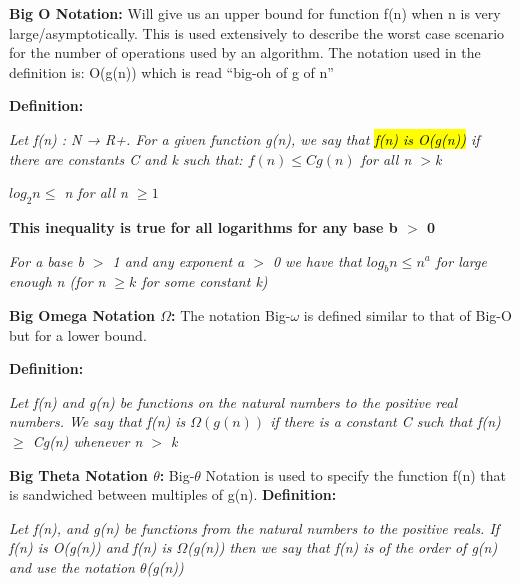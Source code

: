 \documentclass{article}
\begin{document}
\begin{flushleft}
\textbf{Big O Notation:} 
Will give us an upper bound for function f(n) when n is very large/asymptotically. 
This is used extensively to describe the worst case scenario for the number of operations used by an algorithm.
The notation used in the definition is: O(g(n)) which is read “big-oh of g of n”

\textbf{Definition:}\begin{tcolorbox}[enhanced,width=7.5in,center upper,size=fbox,drop shadow southwest,sharp corners]
\textit{Let f(n) : N → R+. For a given function g(n), we say that \hl{f(n) is O(g(n))} if there are constants C and k such that: $f(n) \leq Cg(n)$ for all n $>$k}
\end{tcolorbox}

\begin{tcolorbox}[enhanced,width=2in,center upper,size=fbox,drop shadow southwest,sharp corners]
\textit{$log_2 n \leq$ n for all n $\geq 1$}
\end{tcolorbox}

\textbf{This inequality is true for all logarithms for any base b $>$ 0}
\begin{tcolorbox}[enhanced,width=7.5in,center upper,size=fbox,drop shadow southwest,sharp corners]
\textit{For a base \textit{b} $>$ 1 and any exponent \textit{a} $>$ 0 we have that $log_b n \leq n^a$ for large enough n (for n $\geq k$ for some constant k)}
\end{tcolorbox} 

\vspace{8mm}\textbf{Big Omega Notation $\Omega$:}
The notation Big-$\omega$ is defined similar to that of Big-O but for a lower bound.

\textbf{Definition:}\begin{tcolorbox}[enhanced,width=7.5in,center upper,size=fbox,drop shadow southwest,sharp corners]
\textit{Let f(n) and g(n) be functions on the natural numbers to the positive real numbers. We say that f(n) is $\Omega(g(n))$ if there is a constant C such that f(n) $\geq$ Cg(n) whenever n $>$ k}
\end{tcolorbox}

\vspace{8mm}\textbf{Big Theta Notation $\theta$:}
Big-$\theta$ Notation is used to specify the function f(n) that is sandwiched between multiples of g(n).
\textbf{Definition:}\begin{tcolorbox}[enhanced,width=7.5in,center upper,size=fbox,drop shadow southwest,sharp corners]
\textit{Let f(n), and g(n) be functions from the natural numbers to the positive reals. If f(n) is O(g(n)) and f(n) is $\Omega$(g(n)) then we say that f(n) is of the order of g(n) and use the notation $\theta$(g(n))}
\end{tcolorbox}


\end{flushleft}
\end{document}
